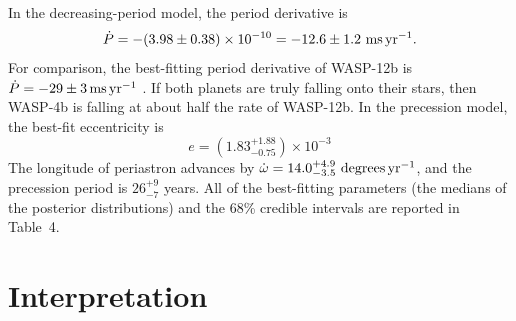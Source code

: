 \documentclass[12pt,twocolumn,tighten]{aastex62}
\begin{document}
In the decreasing-period model, the period derivative is
\begin{equation}
\dot{P}
  = - (3.98 \pm 0.38)\times 10^{-10}
  = - 12.6 \pm 1.2~{\rm ms}\,{\rm yr}^{-1}.
  \label{eq:dP_dt_obs}
\end{equation}
For comparison, the best-fitting period derivative of WASP-12b is
$\dot{P} = -29 \pm 3\,{\rm ms}\,{\rm yr}^{-1}$
\citep{maciejewski_departure_2016,patra_2017}.  If both planets are
truly falling onto their stars, then WASP-4b is falling at about half
the rate of WASP-12b.  In the precession model, the best-fit
eccentricity is
\begin{equation}
  e = (1.83^{+ 1.88}_{- 0.75})\times10^{-3}
\end{equation}
The longitude of periastron advances by $\dot{\omega} =
14.0^{+4.9}_{-3.5}\ {\rm degrees}\,{\rm yr}^{-1}$, and the precession
period is $26^{+9}_{-7}$ years.  All of the best-fitting parameters
(the medians of the posterior distributions) and the 68\% credible
intervals are reported in Table~4.


\section{Interpretation}
\label{sec:implications}
\end{document}
